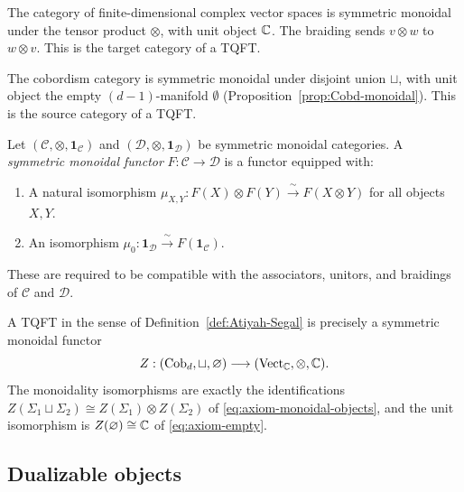 \begin{example}\label{ex:Vect-monoidal}
The category of finite-dimensional complex vector spaces is symmetric monoidal under the tensor product $\otimes$, with unit object $\mathbb{C}$.  The braiding sends $v \otimes w$ to $w \otimes v$.  This is the target category of a TQFT.
\end{example}

\begin{example}\label{ex:Cobd-monoidal-app}
The cobordism category is symmetric monoidal under disjoint union $\sqcup$, with unit object the empty $(d{-}1)$-manifold $\emptyset$ (Proposition~\ref{prop:Cobd-monoidal}).  This is the source category of a TQFT.
\end{example}

\begin{definition}\label{def:monoidal-functor}
Let $(\mathcal{C}, \otimes, \mathbf{1}_{\mathcal{C}})$ and $(\mathcal{D}, \otimes, \mathbf{1}_{\mathcal{D}})$ be symmetric monoidal categories.  A \emph{symmetric monoidal functor} $F : \mathcal{C} \to \mathcal{D}$ is a functor equipped with:
\begin{enumerate}
\item A natural isomorphism $\mu_{X,Y} : F(X) \otimes F(Y) \xrightarrow{\;\sim\;} F(X \otimes Y)$ for all objects $X, Y$.
\item An isomorphism $\mu_0 : \mathbf{1}_{\mathcal{D}} \xrightarrow{\;\sim\;} F(\mathbf{1}_{\mathcal{C}})$.
\end{enumerate}
These are required to be compatible with the associators, unitors, and braidings of $\mathcal{C}$ and $\mathcal{D}$.
\end{definition}

\noindent A TQFT in the sense of Definition~\ref{def:Atiyah-Segal} is precisely a symmetric monoidal functor
\begin{equation}\label{eq:TQFT-as-smf}
Z : (\mathrm{Cob}_d, \sqcup, \varnothing) \longrightarrow (\mathrm{Vect}_{\mathbb{C}}, \otimes, \mathbb{C}).
\end{equation}
The monoidality isomorphisms are exactly the identifications $Z(\Sigma_1 \sqcup \Sigma_2) \cong Z(\Sigma_1) \otimes Z(\Sigma_2)$ of \eqref{eq:axiom-monoidal-objects}, and the unit isomorphism is $Z(\varnothing) \cong \mathbb{C}$ of \eqref{eq:axiom-empty}.

\subsection{Dualizable objects}\label{appsec:dualizable}

